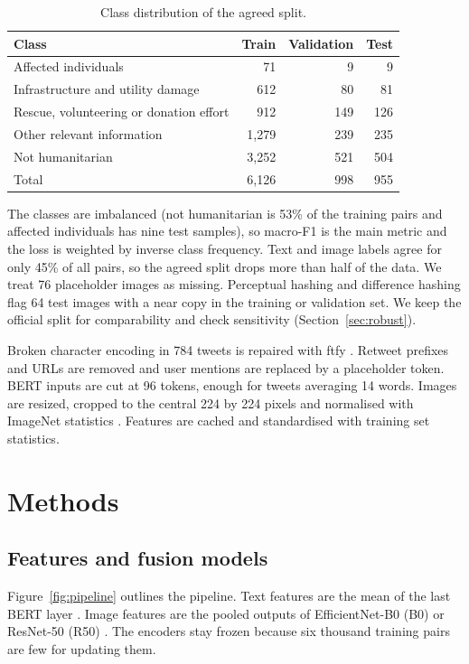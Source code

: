 \documentclass[11pt,a4paper]{article}
\begin{document}
\begin{table}[H]
  \centering
  \small
  \caption{Class distribution of the agreed split.}
  \label{tab:data}
  \begin{tabular}{lrrr}
    \toprule
    Class & Train & Validation & Test \\
    \midrule
    Affected individuals & 71 & 9 & 9 \\
    Infrastructure and utility damage & 612 & 80 & 81 \\
    Rescue, volunteering or donation effort & 912 & 149 & 126 \\
    Other relevant information & 1,279 & 239 & 235 \\
    Not humanitarian & 3,252 & 521 & 504 \\
    \midrule
    Total & 6,126 & 998 & 955 \\
    \bottomrule
  \end{tabular}
\end{table}

The classes are imbalanced (not humanitarian is 53\% of the training
pairs and affected individuals has nine test samples), so macro-F1 is the
main metric and the loss is weighted by inverse class frequency. Text and
image labels agree for only 45\% of all pairs, so the agreed split drops
more than half of the data. We treat 76 placeholder images as missing. Perceptual hashing \citep{Zauner2010} and difference
hashing \citep{Krawetz2013} flag 64 test images with a near copy in the
training or validation set. We keep the official split for comparability and check sensitivity (Section~\ref{sec:robust}).

Broken character encoding in 784 tweets is repaired with ftfy
\citep{Speer2019}. Retweet prefixes and URLs are removed and user
mentions are replaced by a placeholder token. BERT inputs are cut at 96 tokens, enough for tweets averaging 14 words. Images are resized,
cropped to the central 224 by 224 pixels and normalised with ImageNet
statistics \citep{Deng2009}. Features are cached and standardised with training set statistics.

\section{Methods}
\label{sec:method}
\subsection{Features and fusion models}
Figure~\ref{fig:pipeline} outlines the pipeline. Text features are the
mean of the last BERT layer \citep{Devlin2019}. Image
features are the pooled outputs of EfficientNet-B0 (B0)
\citep{TanLe2019} or ResNet-50 (R50) \citep{He2016}.
The encoders stay frozen because six thousand training pairs are few for updating them.
\end{document}
